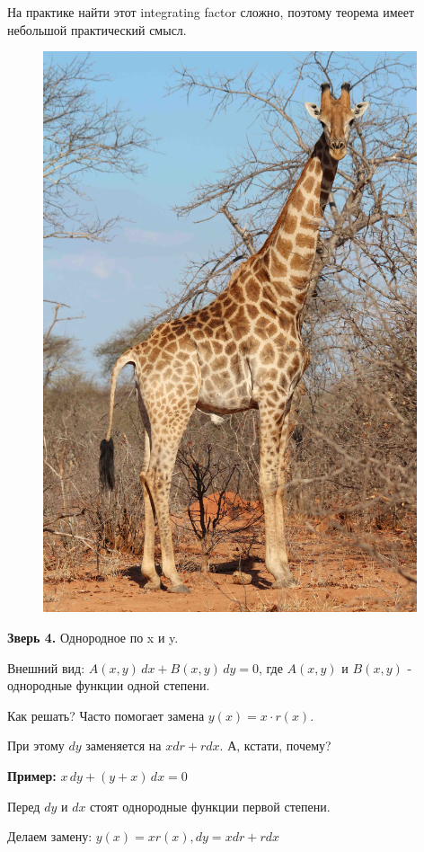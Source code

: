 \documentclass[10pt,a4paper]{article}
\begin{document}
\par На практике найти этот integrating factor сложно, поэтому теорема имеет небольшой практический смысл. \\
\newpage
\pagecolor{JungleGreen}
\begin{figure}[h]
\centering
\includegraphics[width = 11cm]{giraffe.jpg}
\end{figure}
\par \textbf{Зверь 4.} Однородное по x и y.
\par Внешний вид: $A(x, y) \, dx + B(x,y) \, dy = 0$,  где $A(x,y)$ и $B(x,y)$ - однородные функции одной степени.
\par Как решать? Часто помогает замена $y(x) = x \cdot r(x)$.
\par При этому $dy$ заменяется на $xdr + rdx$. А, кстати, почему?
\par \textbf{Пример:} $x \, dy + (y+x) \, dx = 0$
\par Перед $dy$ и $dx$ стоят однородные функции первой степени.
\par Делаем замену: $y(x) = xr(x), dy = xdr + rdx $
\end{document}
